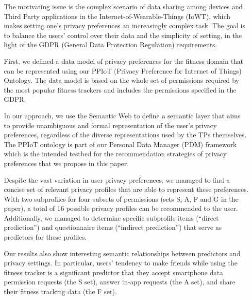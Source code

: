 The motivating issue is the complex scenario of data sharing among devices and Third Party applications in the Internet-of-Wearable-Things (IoWT), which makes setting
one's privacy preferences  an increasingly complex task. 
The goal is to balance the users' control over their data and the simplicity of setting, in the light of the GDPR (General Data Protection Regulation) requirements.

First, we defined  a data model of privacy preferences for the fitness domain  that can
be represented using our PPIoT (Privacy Preference for Internet of Things) Ontology.
The data model is based on the whole set of permissions required by the most popular fitness trackers and includes the permissions specified in the GDPR.

In our approach, we use the Semantic Web to define a semantic layer that aims to provide unambiguous and formal  representation of the user's
privacy preferences, regardless of the diverse representations used by the TPs themselves. The PPIoT ontology is part of our Personal Data Manager (PDM) framework which is the intended testbed for the recommendation strategies of privacy preferences that we propose in this paper.

Despite the vast variation in user privacy preferences, we managed to find a concise set of relevant privacy profiles that are able to represent these preferences. With two subprofiles for four subsets of permissions (sets S, A, F and G in the paper), a total of 16 possible privacy profiles can be recommended to the user. Additionally, we managed to determine specific subprofile items (``direct prediction'') and questionnaire items (``indirect prediction'') that serve as predictors for these profiles.

Our results also show interesting semantic relationships between predictors and privacy settings. In particular, users' tendency to make friends while using the fitness tracker is a significant predictor that they accept smartphone data permission requests (the S set), answer in-app requests (the A set), and share their fitness tracking data (the F set).  

